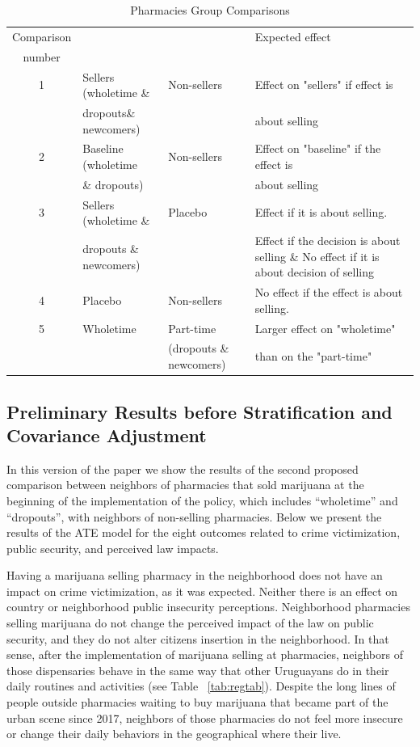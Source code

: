 \documentclass[11pt]{article}
\begin{document}
\begin{table}[H]
        \centering
        \footnotesize
        \caption{Pharmacies Group Comparisons}
    \label{tab:comparisons}
    \begin{tabular}{clll}
Comparison	      &		&		&	Expected effect	\\
number	      &		&		&		\\ \hline
1	      &	Sellers (wholetime \&	&	Non-sellers	&	Effect on "sellers" if effect is	\\
	      &	dropouts\& newcomers)	&		&	about selling	\\
2	      &	Baseline (wholetime	&	Non-sellers	&	Effect on "baseline" if the effect is 	\\
	      &	\& dropouts)	&		&	about selling	\\
3	      &	Sellers (wholetime \&	&	Placebo	&	Effect if it is about selling. 	\\
	      &	dropouts \& newcomers)	&		&	Effect if the decision is about selling \& No effect if it is about decision of selling	\\
4	      &	Placebo 	&	Non-sellers	&	No effect if the effect is about selling. 	\\
5	      &	Wholetime	&	Part-time	&	Larger effect on "wholetime" 	\\
	      &		&	 (dropouts \& newcomers)	&	than on the "part-time"	\\ \hline
\end{tabular}
\end{table}

\subsection{Preliminary Results before Stratification and Covariance Adjustment}

In this version of the paper we show the results of the second proposed comparison between neighbors of pharmacies that sold marijuana at the beginning of the implementation of the policy, which includes ``wholetime'' and ``dropouts'', with neighbors of non-selling pharmacies. Below we present the results of the ATE model for the eight outcomes related to crime victimization, public security, and perceived law impacts.

Having a marijuana selling pharmacy in the neighborhood does not have an impact on crime victimization, as it was expected. Neither there is an effect on country or neighborhood public insecurity perceptions. Neighborhood pharmacies selling marijuana do not change the perceived impact of the law on public security, and they do not alter citizens insertion in the neighborhood. In that sense, after the implementation of marijuana selling at pharmacies, neighbors of those dispensaries behave in the same way that other Uruguayans do in their daily routines and activities (see Table ~\ref{tab:regtab}). Despite the long lines of people outside pharmacies waiting to buy marijuana that became part of the urban scene since 2017, neighbors of those pharmacies do not feel more insecure or change their daily behaviors in the geographical where their live.
\end{document}
